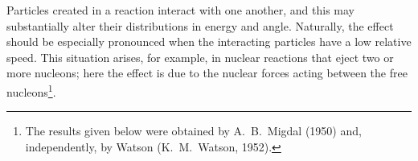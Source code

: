 Particles created in a reaction interact with one another, and this may substantially alter their distributions in energy and angle. Naturally, the effect should be especially pronounced when the interacting particles have a low relative speed. This situation arises, for example, in nuclear reactions that eject two or more nucleons; here the effect is due to the nuclear forces acting between the free nucleons\footnote{The results given below were obtained by A.~B.~Migdal (1950) and, independently, by Watson (K.~M.~Watson, 1952).}.
